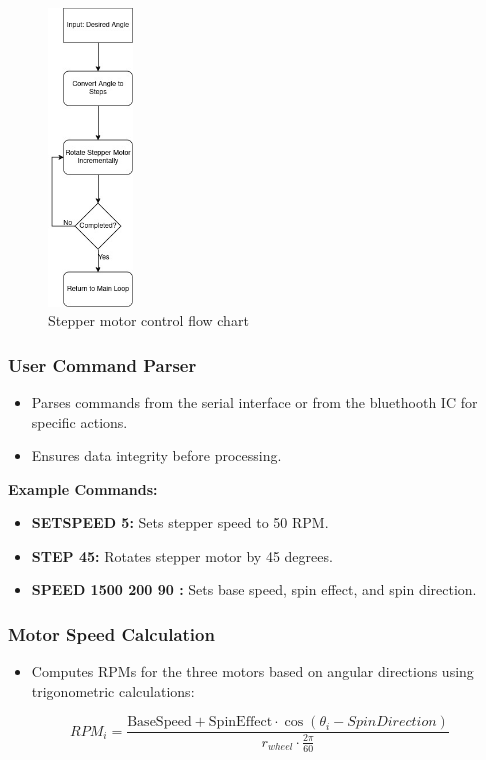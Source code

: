 \documentclass[12pt]{report}
\begin{document}
\begin{figure}[H]
    \centering
    \includegraphics[width=0.2\textwidth]{CH5 figureler/salih figureler/Stepper motor control flow chart.jpg}
    \caption{Stepper motor control flow chart}
    \label{fig:Stepper motor control flow chart}
\end{figure}

\subsubsection{User Command Parser}

\begin{itemize}
    \item Parses commands from the serial interface or from the bluethooth IC for specific actions.
    \item Ensures data integrity before processing.
\end{itemize}

\textbf{Example Commands:}

\begin{itemize}
    \item \textbf{SETSPEED 5:} Sets stepper speed to 50 RPM.
    \item \textbf{STEP 45:} Rotates stepper motor by 45 degrees.
    \item \textbf{SPEED 1500 200 90 :} Sets base speed, spin effect, and spin direction.
\end{itemize}

\subsubsection{Motor Speed Calculation}
\begin{itemize}
    \item Computes RPMs for the three motors based on angular directions using trigonometric calculations:
\end{itemize}
\[RPM_i = \frac{\mathrm{BaseSpeed + SpinEffect} \cdot \cos(\theta_i - SpinDirection)}{r_{wheel} \cdot \frac{2\pi}{60}}\]
\end{document}
